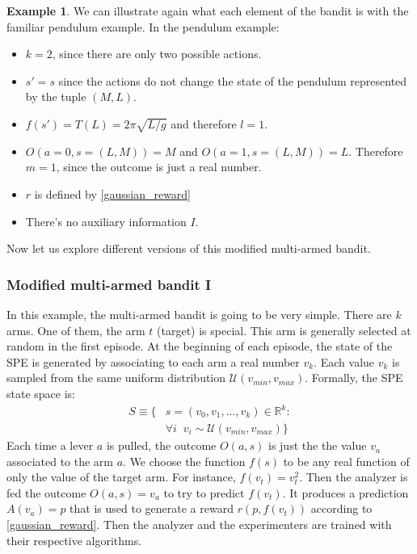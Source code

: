 \documentclass[11pt,a4paper,twoside]{report}
\newcommand{\+}{\textnormal{+} }
\theoremstyle{definition}
\newtheorem{myex}[mythm]{Example}
\numberwithin{equation}{chapter}
\begin{document}
\begin{myex}
  We can illustrate again what each element of the bandit is with the familiar
  pendulum example. In the pendulum example:
  \begin{itemize}
    \item $k=2$, since there are only two possible actions.
    \item $s'=s$ since the actions do not change the state of the pendulum 
    represented by the tuple $(M,L)$.
    \item $f(s')=T(L)=2\pi\sqrt{L/g}$ and therefore $l=1$.
    \item $O(a=0,s=(L,M))=M$ and $O(a=1, s=(L,M))=L$. Therefore $m=1$, since 
    the outcome is just a real number.
    \item $r$ is defined by \eqref{gaussian_reward}
    \item There's no auxiliary information $I$.
  \end{itemize}
  
\end{myex}

Now let us explore different versions of this modified multi-armed bandit.

\subsubsection{Modified multi-armed bandit I}

  In this example, the multi-armed bandit is going to be very simple. There are
  $k$ arms. One of them, the arm $t$ (target) is special. This arm is generally
  selected at random in the first episode. At the beginning of each episode, the
  state of the SPE is generated by associating to each arm a real number $v_k$.
  Each value $v_k$ is sampled from the same uniform distribution
  $\mathcal{U}(v_{min},v_{max})$. Formally, the SPE state space is:
  \begin{align}
    S\equiv\{&s=(v_0, v_1,...,v_k) \in \mathbb{R}^k: \\
    & \forall i \; \; v_i \sim \mathcal{U}(v_{min},v_{max})
    \}
  \end{align}
  Each time a lever $a$ is pulled, the outcome $O(a,s)$ is just the the value
  $v_a$ associated to the arm $a$. We choose the function $f(s)$ to be any real
  function of only the value of the target arm. For instance, $f(v_t)=v_t^2$.
  Then the analyzer is fed the outcome $O(a,s)=v_a$ to try to predict $f(v_t)$.
  It produces a prediction $A(v_a)=p$ that is used to generate a reward
  $r(p,f(v_t))$ according to \eqref{gaussian_reward}. Then the analyzer and the
  experimenters are trained with their respective algorithms.
\end{document}
